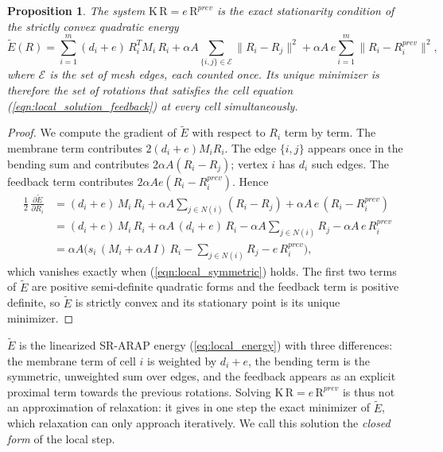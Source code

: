 \documentclass{birkjour}
\newtheorem{prop}[thm]{Proposition}
\theoremstyle{remark}
\numberwithin{equation}{section}
\begin{document}
\begin{prop}
\label{prop:exact_energy}
The system $\mathrm K \, \mathrm R = e \, \mathrm R^{prev}$ is the exact stationarity condition of the strictly convex quadratic energy
\begin{equation}
\label{eq:exact_energy}
\tilde E(R) = \sum_{i=1}^m (d_i + e) \, R_i^T M_i \, R_i
+ \alpha A \sum_{\{i,j\} \in \mathcal E} \| R_i - R_j \|^2
+ \alpha A \, e \sum_{i=1}^m \| R_i - R^{prev}_i \|^2 ,
\end{equation}
where $\mathcal E$ is the set of mesh edges, each counted once. Its unique minimizer is therefore the set of rotations that satisfies the cell equation (\ref{eqn:local_solution_feedback}) at every cell simultaneously.
\end{prop}
\begin{proof}
We compute the gradient of $\tilde E$ with respect to $R_i$ term by term. The membrane term contributes $2 (d_i + e) M_i R_i$. The edge $\{i, j\}$ appears once in the bending sum and contributes $2 \alpha A (R_i - R_j)$; vertex $i$ has $d_i$ such edges. The feedback term contributes $2 \alpha A e (R_i - R^{prev}_i)$. Hence
\begin{align*}
\tfrac{1}{2} \, \frac{\partial \tilde E}{\partial R_i}
&= (d_i + e) \, M_i \, R_i + \alpha A \sum_{j \in N(i)} (R_i - R_j) + \alpha A \, e \, (R_i - R^{prev}_i) \\
&= (d_i + e) \, M_i \, R_i + \alpha A \, (d_i + e) \, R_i - \alpha A \sum_{j \in N(i)} R_j - \alpha A \, e \, R^{prev}_i \\
&= \alpha A \Big( s_i \, (M_i + \alpha A \, I) \, R_i - \sum_{j \in N(i)} R_j - e \, R^{prev}_i \Big),
\end{align*}
which vanishes exactly when (\ref{eqn:local_symmetric}) holds. The first two terms of $\tilde E$ are positive semi-definite quadratic forms and the feedback term is positive definite, so $\tilde E$ is strictly convex and its stationary point is its unique minimizer.
\end{proof}

$\tilde E$ is the linearized SR-ARAP energy (\ref{eq:local_energy}) with three differences: the membrane term of cell $i$ is weighted by $d_i + e$, the bending term is the symmetric, unweighted sum over edges, and the feedback appears as an explicit proximal term towards the previous rotations. Solving $\mathrm K \, \mathrm R = e \, \mathrm R^{prev}$ is thus not an approximation of relaxation: it gives in one step the exact minimizer of $\tilde E$, which relaxation can only approach iteratively. We call this solution the \emph{closed form} of the local step.
\end{document}
